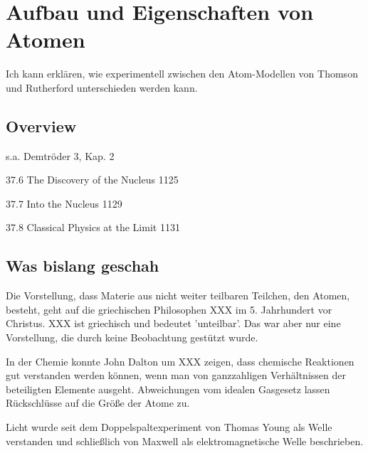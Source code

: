 \renewcommand{\lastmod}{10. September 2024}
\renewcommand{\chapterauthors}{Markus Lippitz}

\chapter{Aufbau und Eigenschaften von Atomen}





Ich kann erklären, wie experimentell zwischen den Atom-Modellen von Thomson und Rutherford unterschieden werden kann.

\section{Overview}

s.a. Demtröder 3, Kap. 2




37.6 The Discovery of the Nucleus 1125

37.7 Into the Nucleus 1129

37.8 Classical Physics at the Limit 1131






\section{Was bislang geschah}

Die Vorstellung, dass Materie aus nicht weiter teilbaren Teilchen, den Atomen, besteht, geht auf die griechischen Philosophen XXX im 5. Jahrhundert vor Christus. XXX ist griechisch und bedeutet 'unteilbar'. Das war aber nur eine Vorstellung, die durch keine Beobachtung gestützt wurde.

In der Chemie konnte John Dalton um XXX zeigen, dass chemische Reaktionen gut verstanden werden können, wenn man von ganzzahligen Verhältnissen der beteiligten Elemente ausgeht. Abweichungen vom idealen Gasgesetz lassen Rückschlüsse auf die Größe der Atome zu.

Licht wurde seit dem Doppelspaltexperiment von Thomas Young als Welle verstanden und schließlich von Maxwell als elektromagnetische Welle beschrieben.

